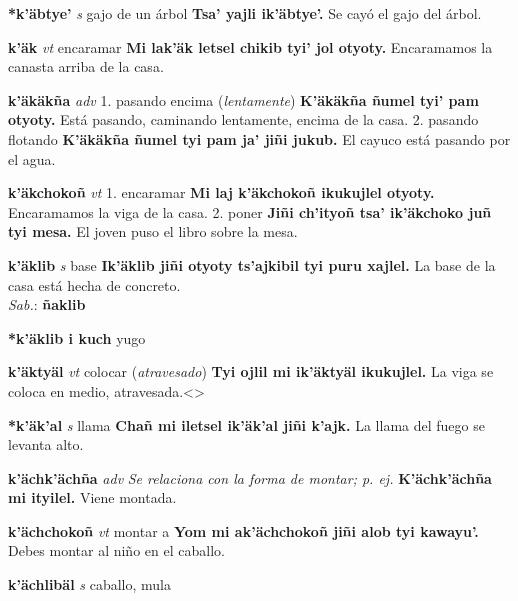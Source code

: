 \documentclass[10pt]{scrbook}
\newcommand{\entry}[1]{\textbf{#1}}
\newcommand{\onedefinition}[1]{#1.}
\newcommand{\nontranslationdef}[1]{\textit{#1}}
\newcommand{\partofspeech}[1]{\textit{#1}}
\newcommand{\spanishtranslation}[1]{#1}
\newcommand{\clarification}[1]{(\textit{#1})}
\newcommand{\cholexample}[1]{\textbf{#1}}
\newcommand{\exampletranslation}[1]{#1}
\newcommand{\dialectvariant}[1]{\\\textit{#1}:}
\newcommand{\dialectword}[1]{\textbf{#1}}
\begin{document}
\begin{multicols}{2}
\entry{*k'äbtye'}
\partofspeech{s}
\spanishtranslation{gajo de un árbol}
\cholexample{Tsa' yajli ik'äbtye'.}
\exampletranslation{Se cayó el gajo del árbol.}

\entry{k'äk}
\partofspeech{vt}
\spanishtranslation{encaramar}
\cholexample{Mi lak'äk letsel chikib tyi' jol otyoty.}
\exampletranslation{Encaramamos la canasta arriba de la casa.}

\entry{k'äkäkña}
\partofspeech{adv}
\onedefinition{1}
\spanishtranslation{pasando encima}
\clarification{lentamente}
\cholexample{K'äkäkña ñumel tyi' pam otyoty.}
\exampletranslation{Está pasando, caminando lentamente, encima de la casa.}
\onedefinition{2}
\spanishtranslation{pasando flotando}
\cholexample{K'äkäkña ñumel tyi pam ja' jiñi jukub.}
\exampletranslation{El cayuco está pasando por el agua.}

\entry{k'äkchokoñ}
\partofspeech{vt}
\onedefinition{1}
\spanishtranslation{encaramar}
\cholexample{Mi laj k'äkchokoñ ikukujlel otyoty.}
\exampletranslation{Encaramamos la viga de la casa.}
\onedefinition{2}
\spanishtranslation{poner}
\cholexample{Jiñi ch'ityoñ tsa' ik'äkchoko juñ tyi mesa.}
\exampletranslation{El joven puso el libro sobre la mesa.}

\entry{k'äklib}
\partofspeech{s}
\spanishtranslation{base}
\cholexample{Ik'äklib jiñi otyoty ts'ajkibil tyi puru xajlel.}
\exampletranslation{La base de la casa está hecha de concreto.}
\dialectvariant{Sab.}
\dialectword{ñaklib}

\entry{*k'äklib i kuch}
\spanishtranslation{yugo}

\entry{k'äktyäl}
\partofspeech{vt}
\spanishtranslation{colocar}
\clarification{atravesado}
\cholexample{Tyi ojlil mi ik'äktyäl ikukujlel.}
\exampletranslation{La viga se coloca en medio, atravesada.<>}

\entry{*k'äk'al}
\partofspeech{s}
\spanishtranslation{llama}
\cholexample{Chañ mi iletsel ik'äk'al jiñi k'ajk.}
\exampletranslation{La llama del fuego se levanta alto.}

\entry{k'ächk'ächña}
\partofspeech{adv}
\nontranslationdef{Se relaciona con la forma de montar; p. ej.}
\cholexample{K'ächk'ächña mi ityilel.}
\exampletranslation{Viene montada.}

\entry{k'ächchokoñ}
\partofspeech{vt}
\spanishtranslation{montar a}
\cholexample{Yom mi ak'ächchokoñ jiñi alob tyi kawayu'.}
\exampletranslation{Debes montar al niño en el caballo.}

\entry{k'ächlibäl}
\partofspeech{s}
\spanishtranslation{caballo, mula}


\end{multicols}
\end{document}
